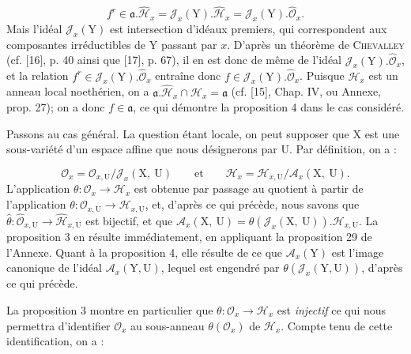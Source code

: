 \begin{equation*}
f^r \in \mathfrak{a}.\hat{\mathcal{H}}_x = \mathcal{J}_x(\mathrm{Y}).\hat{\mathcal{H}}_x = \mathcal{J}_x(\mathrm{Y}).\hat{\mathcal{O}}_x.
\end{equation*}
Mais l'idéal $\mathcal{J}_x(\mathrm{Y})$ est intersection d'idéaux premiers, qui correspondent aux composantes irréductibles de $\mathrm{Y}$ passant par $x$. D'après un théorème de \textsc{Chevalley} (cf. [16], p. 40 ainsi que [17], p. 67), il en est donc de même de l'idéal $\mathcal{J}_x(\mathrm{Y}).\hat{\mathcal{O}}_x$, et la relation $f^r \in \mathcal{J}_x(\mathrm{Y}).\hat{\mathcal{O}}_x$ entraîne donc $f \in \mathcal{J}_x(\mathrm{Y}).\hat{\mathcal{O}}_x$. Puisque $\mathcal{H}_x$ est un anneau local noethérien, on a $\mathfrak{a}.\hat{\mathcal{H}}_x \cap \mathcal{H}_x = \mathfrak{a}$ (cf. [15], Chap. IV, ou Annexe, prop. 27); on a donc $f \in \mathfrak{a}$, ce qui démontre la proposition 4 dans le cas considéré.

Passons au cas général. La question étant locale, on peut supposer que $\mathrm{X}$ est une sous-variété d'un espace affine que nous désignerons par $\mathrm{U}$. Par définition, on a :

\begin{equation*}
\mathcal{O}_x = \mathcal{O}_{x,\mathrm{U}}/\mathcal{J}_x(\mathrm{X},\ \mathrm{U}) \qquad \mathrm{et} \qquad \mathcal{H}_x = \mathcal{H}_{x,\mathrm{U}}/\mathcal{A}_x(\mathrm{X},\ \mathrm{U}).
\end{equation*}
L'application $\theta : \mathcal{O}_x \to \mathcal{H}_x$ est obtenue par passage au quotient à partir de l'application $\theta : \mathcal{O}_{x,\mathrm{U}} \to \mathcal{H}_{x,\mathrm{U}}$, et, d'après ce qui précède, nous savons que $\hat{\theta} : \hat{\mathcal{O}}_{x,\mathrm{U}} \to \hat{\mathcal{H}}_{x,\mathrm{U}}$ est bijectif, et que $\mathcal{A}_x(\mathrm{X},\ \mathrm{U}) = \theta(\mathcal{J}_x(\mathrm{X},\ \mathrm{U})).\mathcal{H}_{x,\mathrm{U}}$. La proposition 3 en résulte immédiatement, en appliquant la proposition 29 de l'Annexe. Quant à la proposition 4, elle résulte de ce que $\mathcal{A}_x(\mathrm{Y})$ est l'image %
canonique de l'idéal $\mathcal{A}_x(\mathrm{Y}, \mathrm{U})$, lequel est engendré par $\theta(\mathcal{J}_x(\mathrm{Y}, \mathrm{U}))$, d'après ce qui précède.

La proposition 3 montre en particulier que $\theta : \mathcal{O}_x \to \mathcal{H}_x$ est \textit{injectif} ce qui nous permettra d'identifier $\mathcal{O}_x$ au sous-anneau $\theta(\mathcal{O}_x)$ de $\mathcal{H}_x$. Compte tenu de cette identification, on a :

